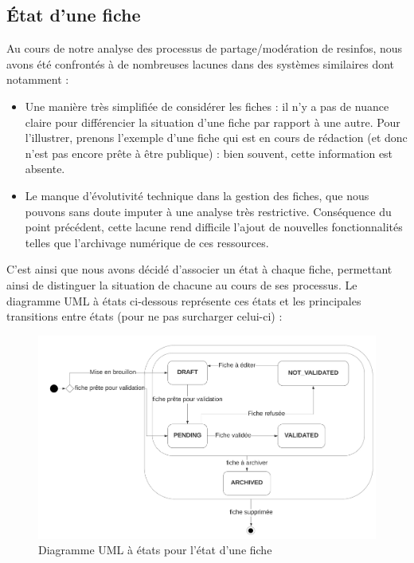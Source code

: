 \subsection*{État d'une \gls{fiche}}

Au cours de notre analyse des processus de partage/modération de \glspl{resinfo}, nous avons été confrontés à de nombreuses lacunes dans des systèmes similaires dont notamment :
\begin{itemize}
    \item Une manière très simplifiée de considérer les \glspl{fiche} : il n'y a pas de nuance claire pour différencier la situation d'une \gls{fiche} par rapport à une autre. Pour l'illustrer, prenons l'exemple d'une \gls{fiche} qui est en cours de rédaction (et donc n'est pas encore prête à être publique) : bien souvent, cette information est absente.
    \item Le manque d'évolutivité technique dans la gestion des \glspl{fiche}, que nous pouvons sans doute imputer à une analyse très restrictive. Conséquence du point précédent, cette lacune rend difficile l'ajout de nouvelles fonctionnalités telles que l'archivage numérique de ces ressources. 
\end{itemize}

C'est ainsi que nous avons décidé d'associer un état à chaque \gls{fiche}, permettant ainsi de distinguer la situation de chacune au cours de ses processus. Le diagramme UML à états ci-dessous représente ces états et les principales transitions entre états (pour ne pas surcharger celui-ci) :

\begin{figure}[H]
    \includegraphics[width=\textwidth,height=\textheight,keepaspectratio]{images/StateFiches.png}
    \centering
    \caption{Diagramme UML à états pour l'état d'une \gls{fiche}}
    \label{pic:stateDiagramForFiches}
\end{figure}

